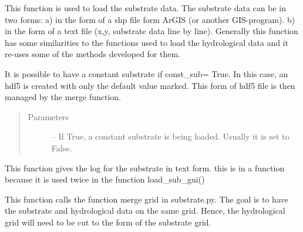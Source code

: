 \documentclass[letterpaper,10pt,english]{sphinxmanual}
\begin{document}
\begin{fulllineitems}
\begin{fulllineitems}
\end{fulllineitems}


\begin{fulllineitems}
\label{\detokenize{index:src_GUI.hydro_GUI_2.SubstrateW.load_sub_gui}}
This function is used to load the substrate data. The substrate data can be in two forms: a) in the form of a shp
file form ArGIS (or another GIS-program). b) in the form of a text file (x,y, substrate data line by line).
Generally this function has some similarities to the functions used to load the hydrological data and it re-uses
some of the methods developed for them.

It is possible to have a constant substrate if const\_sub= True. In this
case, an hdf5 is created with only the default value marked. This form of hdf5 file is then managed by the merge
function.
\begin{quote}\begin{description}
\item[{Parameters}] \leavevmode
{} -- If True, a constant substrate is being loaded. Usually it is set to False.

\end{description}\end{quote}

\end{fulllineitems}


\begin{fulllineitems}
\label{\detokenize{index:src_GUI.hydro_GUI_2.SubstrateW.log_txt}}
This function gives the log for the substrate in text form. this is in a function because it is used twice in
the function load\_sub\_gui()

\end{fulllineitems}


\begin{fulllineitems}
\label{\detokenize{index:src_GUI.hydro_GUI_2.SubstrateW.send_merge_grid}}
This function calls the function merge grid in substrate.py. The goal is to have the substrate and hydrological
data on the same grid. Hence, the hydrological grid will need to be cut to the form of the substrate grid.


\end{fulllineitems}
\end{fulllineitems}
\end{document}
